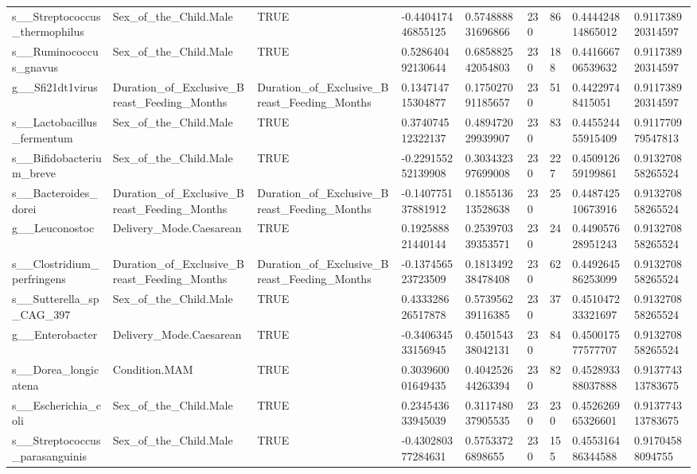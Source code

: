 \begin{longtable}{lllllllll}
s\_\_Streptococcus\_thermophilus & Sex\_of\_the\_Child.Male & TRUE & -0.440417446855125 & 0.574888831696866 & 230 & 86 & 0.444424814865012 & 0.911738920314597 \\
s\_\_Ruminococcus\_gnavus & Sex\_of\_the\_Child.Male & TRUE & 0.528640492130644 & 0.685882542054803 & 230 & 188 & 0.441666706539632 & 0.911738920314597 \\
g\_\_Sfi21dt1virus & Duration\_of\_Exclusive\_Breast\_Feeding\_Months & Duration\_of\_Exclusive\_Breast\_Feeding\_Months & 0.134714715304877 & 0.175027091185657 & 230 & 51 & 0.44229748415051 & 0.911738920314597 \\
s\_\_Lactobacillus\_fermentum & Sex\_of\_the\_Child.Male & TRUE & 0.374074512322137 & 0.489472029939907 & 230 & 83 & 0.445524455915409 & 0.911770979547813 \\
s\_\_Bifidobacterium\_breve & Sex\_of\_the\_Child.Male & TRUE & -0.229155252139908 & 0.303432397699008 & 230 & 227 & 0.450912659199861 & 0.913270858265524 \\
s\_\_Bacteroides\_dorei & Duration\_of\_Exclusive\_Breast\_Feeding\_Months & Duration\_of\_Exclusive\_Breast\_Feeding\_Months & -0.140775137881912 & 0.185513613528638 & 230 & 25 & 0.448742510673916 & 0.913270858265524 \\
g\_\_Leuconostoc & Delivery\_Mode.Caesarean & TRUE & 0.192588821440144 & 0.253970339353571 & 230 & 24 & 0.449057628951243 & 0.913270858265524 \\
s\_\_Clostridium\_perfringens & Duration\_of\_Exclusive\_Breast\_Feeding\_Months & Duration\_of\_Exclusive\_Breast\_Feeding\_Months & -0.137456523723509 & 0.181349238478408 & 230 & 62 & 0.449264586253099 & 0.913270858265524 \\
s\_\_Sutterella\_sp\_CAG\_397 & Sex\_of\_the\_Child.Male & TRUE & 0.433328626517878 & 0.573956239116385 & 230 & 37 & 0.451047233321697 & 0.913270858265524 \\
g\_\_Enterobacter & Delivery\_Mode.Caesarean & TRUE & -0.340634533156945 & 0.450154338042131 & 230 & 84 & 0.450017577577707 & 0.913270858265524 \\
s\_\_Dorea\_longicatena & Condition.MAM & TRUE & 0.303960001649435 & 0.404252644263394 & 230 & 82 & 0.452893388037888 & 0.913774313783675 \\
s\_\_Escherichia\_coli & Sex\_of\_the\_Child.Male & TRUE & 0.234543633945039 & 0.311748037905535 & 230 & 230 & 0.452626965326601 & 0.913774313783675 \\
s\_\_Streptococcus\_parasanguinis & Sex\_of\_the\_Child.Male & TRUE & -0.430280377284631 & 0.57533726898655 & 230 & 155 & 0.455316486344588 & 0.91704588094755 \\

\end{longtable}
